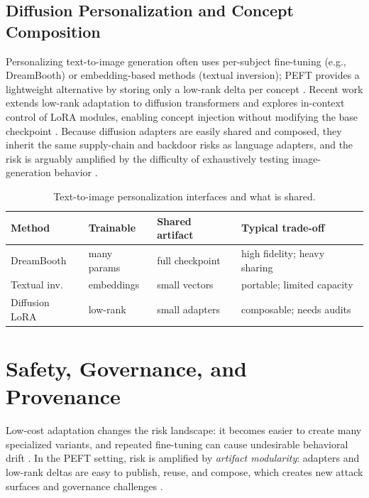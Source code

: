 \documentclass[conference]{IEEEtran}
\begin{document}
\subsection{Diffusion Personalization and Concept Composition}
Personalizing text-to-image generation often uses per-subject fine-tuning (e.g., DreamBooth) or embedding-based methods (textual inversion); PEFT provides a lightweight alternative by storing only a low-rank delta per concept \cite{ruiz2022dreambooth,gal2022an,rombach2021high}. Recent work extends low-rank adaptation to diffusion transformers and explores in-context control of LoRA modules, enabling concept injection without modifying the base checkpoint \cite{huang2024in}. Because diffusion adapters are easily shared and composed, they inherit the same supply-chain and backdoor risks as language adapters, and the risk is arguably amplified by the difficulty of exhaustively testing image-generation behavior \cite{lyu2026when,yin2024lobam}.

\begin{table}[t]
    \centering
    \caption{Text-to-image personalization interfaces and what is shared.}
    \label{tab:diffusion-personalization}
    \scriptsize
    \setlength{\tabcolsep}{3pt}
    \begin{tabular}{p{1.55cm}p{1.35cm}p{1.65cm}p{1.55cm}}
        \toprule
        \textbf{Method} & \textbf{Trainable} & \textbf{Shared artifact} & \textbf{Typical trade-off} \\
        \midrule
        DreamBooth \cite{ruiz2022dreambooth} & many params & full checkpoint & high fidelity; heavy sharing \\
        Textual inv. \cite{gal2022an} & embeddings & small vectors & portable; limited capacity \\
        Diffusion LoRA \cite{huang2024in} & low-rank & small adapters & composable; needs audits \\
        \bottomrule
    \end{tabular}
\end{table}

\section{Safety, Governance, and Provenance}
Low-cost adaptation changes the risk landscape: it becomes easier to create many specialized variants, and repeated fine-tuning can cause undesirable behavioral drift \cite{taraghi2025efficiency,han2024parameter}. In the PEFT setting, risk is amplified by \emph{artifact modularity}: adapters and low-rank deltas are easy to publish, reuse, and compose, which creates new attack surfaces and governance challenges \cite{pfeiffer2020adapterhub,liu2024loratk}.
\end{document}
